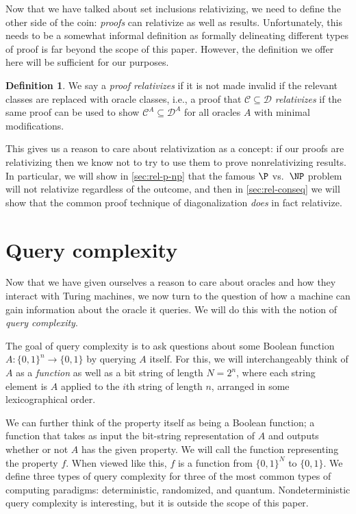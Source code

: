 \documentclass[english,12pt]{reedthesis}
\theoremstyle{plain}
\theoremstyle{definition}
\newtheorem{defn}[defn]{Definition}
\theoremstyle{remark}
\begin{document}
Now that we have talked about set inclusions relativizing, we need to define the
other side of the coin: \emph{proofs} can relativize as well as results.
Unfortunately, this needs to be a somewhat informal definition as formally
delineating different types of proof is far beyond the scope of this paper.
However, the definition we offer here will be sufficient for our purposes.

\begin{defn}\label{def:relativizing-result}
  We say a \emph{proof relativizes} if it is not made invalid if the relevant
  classes are replaced with oracle classes, i.e., a proof that $\mathcal{C} \subseteq \mathcal{D}$
  \emph{relativizes} if the same proof can be used to show $\mathcal{C}^{A} \subseteq \mathcal{D}^{A}$ for
  all oracles $A$ with minimal modifications.
\end{defn}

This gives us a reason to care about relativization as a concept: if our proofs
are relativizing then we know not to try to use them to prove nonrelativizing
results. In particular, we will show in \cref{sec:rel-p-np} that the famous $\P$
vs.\ $\NP$ problem will not relativize regardless of the outcome, and then in
\cref{sec:rel-conseq} we will show that the common proof technique of
diagonalization \emph{does} in fact relativize.

\section{Query complexity}\label{sec:query-complexity}

Now that we have given ourselves a reason to care about oracles and how they
interact with Turing machines, we now turn to the question of how a machine can
gain information about the oracle it queries. We will do this with the notion of
\emph{query complexity}.

The goal of query complexity is to ask questions about some Boolean function
$A\colon \{0, 1\}^{n} \rightarrow \{0, 1\}$ by querying $A$ itself. For this, we will
interchangeably think of $A$ as a \emph{function} as well as a bit string of
length $N = 2^{n}$, where each string element is $A$ applied to the $i$th string
of length $n$, arranged in some lexicographical order.

We can further think of the property itself as being a Boolean function; a
function that takes as input the bit-string representation of $A$ and outputs
whether or not $A$ has the given property. We will call the function
representing the property $f$. When viewed like this, $f$ is a function from
$\{0, 1\}^{N}$ to $\{0, 1\}$. We define three types of query complexity for
three of the most common types of computing paradigms: deterministic,
randomized, and quantum. Nondeterministic query complexity is interesting, but
it is outside the scope of this paper.
\end{document}
